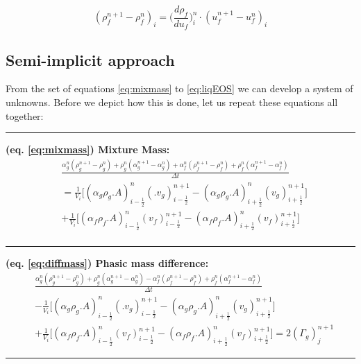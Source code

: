 \documentclass[11pt,letterpaper,titlepage]{article}
\newcommand{\half}{\frac{1}{2}}
\begin{document}
\begin{equation} \label{eq:liqEOS}
(\rho_{f}^{n+1} - \rho_{f}^{n})_i= \biggr( \frac{d\rho_f}{du_f} \biggr)_i^n \cdot (u_{f}^{n+1} - u_{f}^{n})_i
\end{equation}





\newpage
\begin{landscape}
\subsection{Semi-implicit approach}
From the set of equations \ref{eq:mixmass} to \ref{eq:liqEOS} we can develop a system of unknowns. Before we depict how this is done, let us repeat these equations all together:\newline
\noindent\rule{9in}{0.4pt}
\textbf{(eq. \ref{eq:mixmass}) Mixture Mass: }
\begin{equation*}
\begin{aligned}
&\frac{\alpha_g^n (\rho_g^{n+1}-\rho_g^n)+\rho_g^n(\alpha_g^{n+1}-\alpha_g^n)
+\alpha_f^n (\rho_f^{n+1}-\rho_f^n)+\rho_f^n(\alpha_f^{n+1}-\alpha_f^n)}{\Delta t}\\
&= \frac{1}{V_i}\biggr[(\alpha_g\rho_g.A)_{i-\half}^{n} (.v_g)_{i-\half}^{n+1}
-(\alpha_g\rho_g.A)_{i+\half}^{n} (v_g)_{i+\half}^{n+1} \biggr]\\
&+ \frac{1}{V_i}\biggr[(\alpha_f\rho_f.A)_{i-\half}^{n} (v_f)_{i-\half}^{n+1}
-(\alpha_f\rho_f.A)_{i+\half}^{n} (v_f)_{i+\half}^{n+1} \biggr]\\
\end{aligned}
\end{equation*}
\noindent\rule{9in}{0.4pt}
\textbf{(eq. \ref{eq:diffmass}) Phasic mass difference:}
\begin{equation*}
\begin{aligned}
&\frac{\alpha_g^n (\rho_g^{n+1}-\rho_g^n)+\rho_g^n(\alpha_g^{n+1}-\alpha_g^n)-\alpha_f^n (\rho_f^{n+1}-\rho_f^n)+\rho_f^n(\alpha_f^{n+1}-\alpha_f^n)}{\Delta t}\\
&-\frac{1}{V_i}\biggr[(\alpha_g\rho_g.A)_{i-\half}^{n} (.v_g)_{i-\half}^{n+1}
-(\alpha_g\rho_g.A)_{i+\half}^{n} (v_g)_{i+\half}^{n+1} \biggr]\\
&+ \frac{1}{V_i}\biggr[(\alpha_f\rho_f.A)_{i-\half}^{n} (v_f)_{i-\half}^{n+1}
-(\alpha_f\rho_f.A)_{i+\half}^{n} (v_f)_{i+\half}^{n+1} \biggr]
=2(\Gamma_g)_j^{n+1}
\end{aligned}
\end{equation*}
\noindent\rule{9in}{0.4pt}

\end{landscape}
\end{document}
